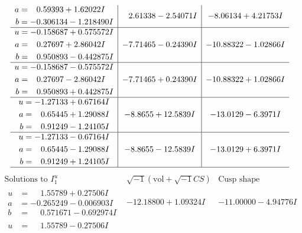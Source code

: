 \documentclass[1p]{elsarticle_modified}
\theoremstyle{definition}
\newcommand{\I}{\sqrt{-1}}
\begin{document}
$$\begin{array}{c|c|c}
\begin{aligned}
a &= \phantom{-}0.59393 + 1.62022 I \\
b &= -0.306134 - 1.218490 I\end{aligned}
 & \phantom{-}2.61338 - 2.54071 I & -8.06134 + 4.21753 I \\ \hline\begin{aligned}
u &= -0.158687 + 0.575572 I \\
a &= \phantom{-}0.27697 + 2.86042 I \\
b &= \phantom{-}0.950893 - 0.442875 I\end{aligned}
 & -7.71465 - 0.24390 I & -10.88322 - 1.02866 I \\ \hline\begin{aligned}
u &= -0.158687 - 0.575572 I \\
a &= \phantom{-}0.27697 - 2.86042 I \\
b &= \phantom{-}0.950893 + 0.442875 I\end{aligned}
 & -7.71465 + 0.24390 I & -10.88322 + 1.02866 I \\ \hline\begin{aligned}
u &= -1.27133 + 0.67164 I \\
a &= \phantom{-}0.65445 + 1.29088 I \\
b &= \phantom{-}0.91249 - 1.24105 I\end{aligned}
 & -8.8655 + 12.5839 I & -13.0129 - 6.3971 I \\ \hline\begin{aligned}
u &= -1.27133 - 0.67164 I \\
a &= \phantom{-}0.65445 - 1.29088 I \\
b &= \phantom{-}0.91249 + 1.24105 I\end{aligned}
 & -8.8655 - 12.5839 I & -13.0129 + 6.3971 I\\
 \hline 
 \end{array}$$\newpage$$\begin{array}{c|c|c}  
\text{Solutions to }I^u_{1}& \I (\text{vol} + \sqrt{-1}CS) & \text{Cusp shape}\\
 \hline 
\begin{aligned}
u &= \phantom{-}1.55789 + 0.27506 I \\
a &= -0.265249 - 0.006903 I \\
b &= \phantom{-}0.571671 - 0.692974 I\end{aligned}
 & -12.18800 + 1.09324 I & -11.00000 - 4.94776 I \\ \hline\begin{aligned}
u &= \phantom{-}1.55789 - 0.27506 I \\

\end{aligned}
\end{array}$$
\end{document}
